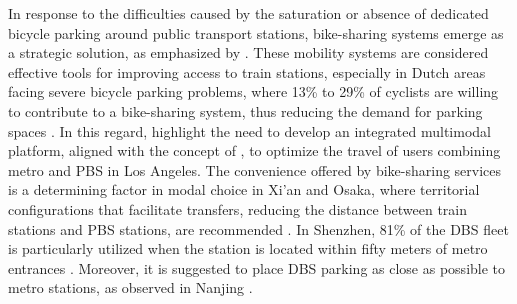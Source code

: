 \begin{refsegment}
In response to the difficulties caused by the saturation or absence of dedicated bicycle parking around public transport stations, bike-sharing systems emerge as a strategic solution, as emphasized by \textcolor{blue}{\textcite[10]{jonkeren_bicycle_2021}}. These mobility systems are considered effective tools for improving access to train stations, especially in Dutch areas facing severe bicycle parking problems, where 13\% to 29\% of cyclists are willing to contribute to a bike-sharing system, thus reducing the demand for parking spaces \textcolor{blue}{\autocite[472]{goeverden_potential_2018}}. In this regard, \textcolor{blue}{\textcite[762]{nam_designing_2018}} highlight the need to develop an integrated multimodal platform, aligned with the concept of , to optimize the travel of users combining metro and \acrshort{PBS} in Los Angeles. The convenience offered by bike-sharing services is a determining factor in modal choice in Xi'an and Osaka, where territorial configurations that facilitate transfers, reducing the distance between train stations and \acrshort{PBS} stations, are recommended \textcolor{blue}{\autocites[172]{yang_bike-and-ride_2014}[3416]{tomita_demand_2017}}. In Shenzhen, 81\% of the \acrshort{DBS} fleet is particularly utilized when the station is located within fifty meters of metro entrances \textcolor{blue}{\autocite[11, 18]{wu_identification_2023}}. Moreover, it is suggested to place \acrshort{DBS} parking as close as possible to metro stations, as observed in Nanjing \textcolor{blue}{\autocite[186]{cheng_exploring_2022}}.%


\end{refsegment}
